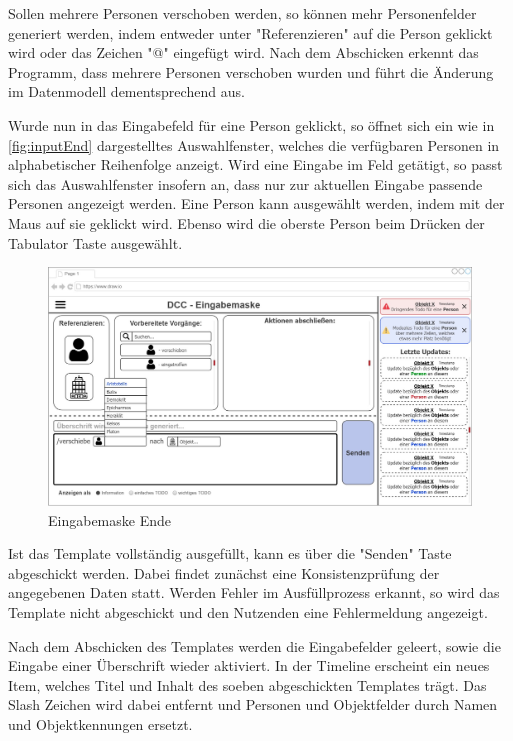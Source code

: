 Sollen mehrere Personen verschoben werden, so können mehr Personenfelder generiert werden, indem entweder unter "Referenzieren" auf die Person geklickt wird oder das Zeichen "@" eingefügt wird.
Nach dem Abschicken erkennt das Programm, dass mehrere Personen verschoben wurden und führt die Änderung im Datenmodell dementsprechend aus.

Wurde nun in das Eingabefeld für eine Person geklickt, so öffnet sich ein wie in \autoref{fig:inputEnd} dargestelltes Auswahlfenster, welches die verfügbaren Personen in alphabetischer Reihenfolge anzeigt.
Wird eine Eingabe im Feld getätigt, so passt sich das Auswahlfenster insofern an, dass nur zur aktuellen Eingabe passende Personen angezeigt werden.
Eine Person kann ausgewählt werden, indem mit der Maus auf sie geklickt wird.
Ebenso wird die oberste Person beim Drücken der Tabulator Taste ausgewählt.


\begin{figure}[htp]
    \centering
    \includegraphics[width=\textwidth]{images/1-MockupsV1/InputScreenEnd.jpg}
    \caption{Eingabemaske Ende}
    \label{fig:inputEnd}
\end{figure}

Ist das Template vollständig ausgefüllt, kann es über die "Senden" Taste abgeschickt werden.
Dabei findet zunächst eine Konsistenzprüfung der angegebenen Daten statt.
Werden Fehler im Ausfüllprozess erkannt, so wird das Template nicht abgeschickt und den Nutzenden eine Fehlermeldung angezeigt.

Nach dem Abschicken des Templates werden die Eingabefelder geleert, sowie die Eingabe einer Überschrift wieder aktiviert.
In der Timeline erscheint ein neues Item, welches Titel und Inhalt des soeben abgeschickten Templates trägt.
Das Slash Zeichen wird dabei entfernt und Personen und Objektfelder durch Namen und Objektkennungen ersetzt.

